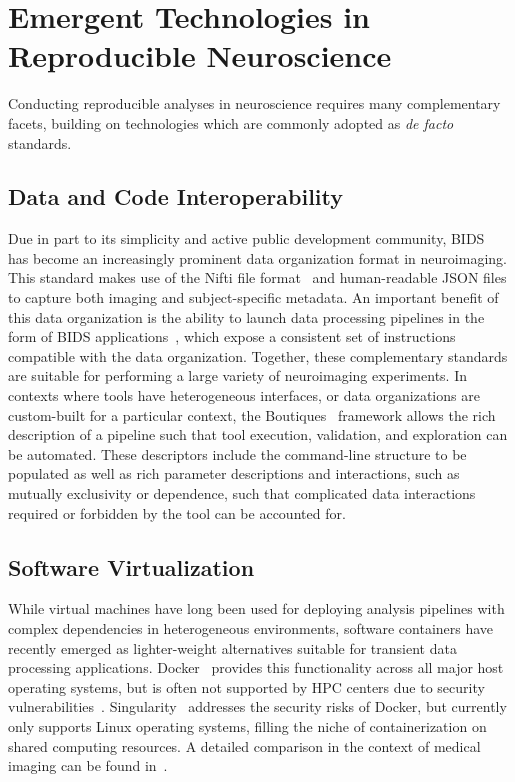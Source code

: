 \documentclass[fleqn,12pt]{SelfArx_ch} %
\begin{document}
\section{Emergent Technologies in Reproducible Neuroscience}

Conducting reproducible analyses in neuroscience requires many complementary facets, building on technologies which are
commonly adopted as \textit{de facto} standards.

\subsection{Data and Code Interoperability}
Due in part to its simplicity and active public development community, BIDS~\cite{Gorgolewski2016-om} has become an
increasingly prominent data organization format in neuroimaging. This standard makes use of the Nifti file
format~\cite{Cox2004-qw} and human-readable JSON files to capture both imaging and subject-specific metadata. An
important benefit of this data organization is the ability to launch data processing pipelines in the form of BIDS
applications~\cite{Gorgolewski2017-sr}, which expose a consistent set of instructions compatible with the data
organization. Together, these complementary standards are suitable for performing a large variety of neuroimaging
experiments. In contexts where tools have heterogeneous interfaces, or data organizations are custom-built for a
particular context, the Boutiques~\cite{Glatard2018-uw} framework allows the rich description of a pipeline such that
tool execution, validation, and exploration can be automated. These descriptors include the command-line structure to
be populated as well as rich parameter descriptions and interactions, such as mutually exclusivity or dependence, such
that complicated data interactions required or forbidden by the tool can be accounted for.

\subsection{Software Virtualization}
While virtual machines have long been used for deploying analysis pipelines with complex dependencies in heterogeneous
environments, software containers have recently emerged as lighter-weight alternatives suitable for transient data
processing applications. Docker~\cite{Merkel2014-vu} provides this functionality across all major host operating
systems, but is often not supported by HPC centers due to security vulnerabilities~\cite{Bui2015-pd,Combe2016-vb}.
Singularity~\cite{Kurtzer2017-kq} addresses the security risks of Docker, but currently only supports Linux operating
systems, filling the niche of containerization on shared computing resources. A detailed comparison in the context of
medical imaging can be found in~\cite{Matelsky2018-sy}.
\end{document}
